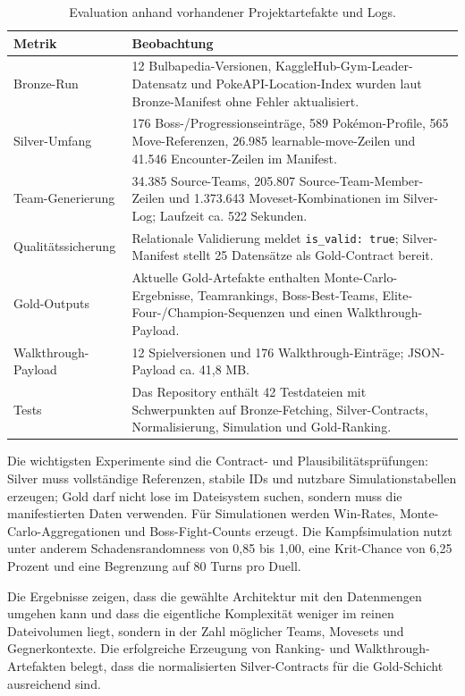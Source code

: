 \documentclass[sigconf,nonacm]{acmart}
\begin{document}
\begin{table}[t]
  \caption{Evaluation anhand vorhandener Projektartefakte und Logs.}
  \label{tab:evaluation}
  \begin{tabularx}{\textwidth}{@{}lX@{}}
    \toprule
    Metrik & Beobachtung \\
    \midrule
    Bronze-Run & 12 Bulbapedia-Versionen, KaggleHub-Gym-Leader-Datensatz und PokeAPI-Location-Index wurden laut Bronze-Manifest ohne Fehler aktualisiert. \\
    Silver-Umfang & 176 Boss-/Progressionseinträge, 589 Pokémon-Profile, 565 Move-Referenzen, 26.985 learnable-move-Zeilen und 41.546 Encounter-Zeilen im Manifest. \\
    Team-Generierung & 34.385 Source-Teams, 205.807 Source-Team-Member-Zeilen und 1.373.643 Moveset-Kombinationen im Silver-Log; Laufzeit ca. 522 Sekunden. \\
    Qualitätssicherung & Relationale Validierung meldet \texttt{is\_valid: true}; Silver-Manifest stellt 25 Datensätze als Gold-Contract bereit. \\
    Gold-Outputs & Aktuelle Gold-Artefakte enthalten Monte-Carlo-Ergebnisse, Teamrankings, Boss-Best-Teams, Elite-Four-/Champion-Sequenzen und einen Walkthrough-Payload. \\
    Walkthrough-Payload & 12 Spielversionen und 176 Walkthrough-Einträge; JSON-Payload ca. 41,8 MB. \\
    Tests & Das Repository enthält 42 Testdateien mit Schwerpunkten auf Bronze-Fetching, Silver-Contracts, Normalisierung, Simulation und Gold-Ranking. \\
    \bottomrule
  \end{tabularx}
\end{table}

Die wichtigsten Experimente sind die Contract- und Plausibilitätsprüfungen: Silver muss vollständige Referenzen, stabile IDs und nutzbare Simulationstabellen erzeugen; Gold darf nicht lose im Dateisystem suchen, sondern muss die manifestierten Daten verwenden. Für Simulationen werden Win-Rates, Monte-Carlo-Aggregationen und Boss-Fight-Counts erzeugt. Die Kampfsimulation nutzt unter anderem Schadensrandomness von 0,85 bis 1,00, eine Krit-Chance von 6,25 Prozent und eine Begrenzung auf 80 Turns pro Duell.

Die Ergebnisse zeigen, dass die gewählte Architektur mit den Datenmengen umgehen kann und dass die eigentliche Komplexität weniger im reinen Dateivolumen liegt, sondern in der Zahl möglicher Teams, Movesets und Gegnerkontexte. Die erfolgreiche Erzeugung von Ranking- und Walkthrough-Artefakten belegt, dass die normalisierten Silver-Contracts für die Gold-Schicht ausreichend sind.
\end{document}
